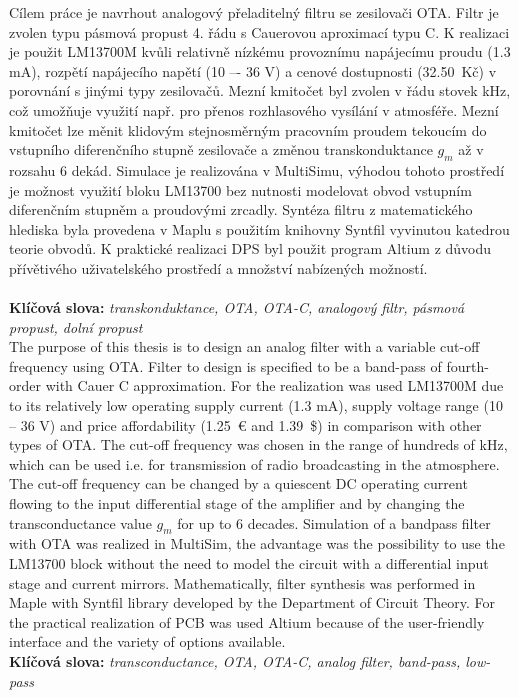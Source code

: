\noindent Cílem práce je navrhout analogový přeladitelný filtru se zesilovači OTA. Filtr je zvolen typu pásmová propust 4. řádu s Cauerovou aproximací typu C. K realizaci je použit LM13700M kvůli relativně nízkému provoznímu napájecímu proudu (1.3 mA), rozpětí napájecího napětí (10 –- 36 V) a cenové dostupnosti (32.50\ Kč) v porovnání s jinými typy zesilovačů. Mezní kmitočet byl zvolen v řádu stovek kHz, což umožňuje využití např. pro přenos rozhlasového vysílání v atmosféře. Mezní kmitočet lze měnit klidovým stejnosměrným pracovním proudem tekoucím do vstupního diferenčního stupně zesilovače a změnou transkonduktance $g_m$ až v rozsahu 6 dekád. Simulace je realizována v MultiSimu, výhodou tohoto prostředí je možnost využití bloku LM13700 bez nutnosti modelovat obvod vstupním diferenčním stupněm a proudovými zrcadly. Syntéza filtru z matematického hlediska byla provedena v Maplu s použitím knihovny Syntfil vyvinutou katedrou teorie obvodů. K praktické realizaci DPS byl použit program Altium z důvodu přívětivého uživatelského prostředí a množství nabízených možností. \\
\\
\noindent \textbf{Klíčová slova:} \textit{transkonduktance, OTA, OTA-C, analogový filtr, pásmová propust, dolní propust}\\

\noindent The purpose of this thesis is to design an analog filter with a variable cut-off frequency using OTA. Filter to design is specified to be a band-pass of fourth-order with Cauer C approximation. For the realization was used LM13700M due to its relatively low operating supply current (1.3 mA), supply voltage range (10 -- 36 V) and price affordability (1.25\ \euro{} and 1.39\ \$) in comparison with other types of OTA. The cut-off frequency was chosen in the range of hundreds of kHz, which can be used i.e. for transmission of radio broadcasting in the atmosphere. The cut-off frequency can be changed by a quiescent DC operating current flowing to the input differential stage of the amplifier and by changing the transconductance value $g_m$ for up to 6 decades. Simulation of a bandpass filter with OTA was realized in MultiSim, the advantage was the possibility to use the LM13700 block without the need to model the circuit with a differential input stage and current mirrors. Mathematically, filter synthesis was performed in Maple with Syntfil library developed by the Department of Circuit Theory. For the practical realization of PCB was used Altium because of the user-friendly interface and the variety of options available. \\

\noindent \textbf{Klíčová slova:} \textit{transconductance, OTA, OTA-C, analog filter, band-pass, low-pass} \\